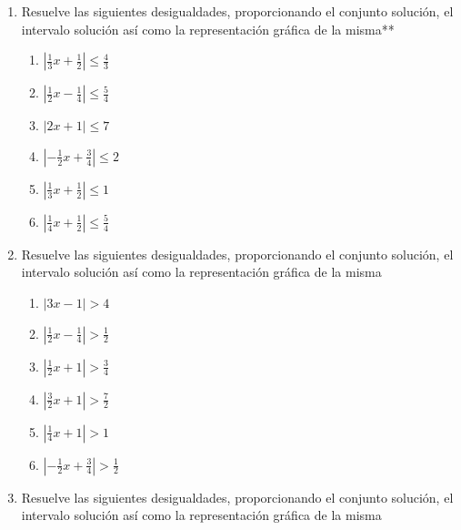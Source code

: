 \documentclass[12pt]{article}
\begin{document}
{\begin{enumerate}
  \begin{enumerate}
  \def\labelenumii{\arabic{enumii}.}
  \setcounter{enumii}{2}
  \item
    \(|3x-1|<7\)
  \item
    \(|x-2|<4\)
  \item
    \(|\frac{3}{2}x+1|<5\)
  \item
    \(|2x+1|<6\)
  \item
    \(|\frac{1}{4}x+1|<\frac{7}{2}\)
  \item
    \(|\frac{1}{3}x+\frac{1}{2}|<\frac{5}{6}\)
  \end{enumerate}
\item
  Resuelve las siguientes desigualdades, proporcionando el conjunto  solución, el intervalo solución así como la representación gráfica de  la misma**

  \begin{enumerate}
  \def\labelenumii{\arabic{enumii}.}
  \setcounter{enumii}{3}
  \item
    \(|\frac{1}{3}x+\frac{1}{2}|\leq \frac{4}{3}\)
  \item
    \(|\frac{1}{2}x-\frac{1}{4}|\leq \frac{5}{4}\)
  \item
    \(|2x+1|\leq 7\)
  \item
    \(|-\frac{1}{2}x+\frac{3}{4}|\leq 2\)
  \item
    \(|\frac{1}{3}x+\frac{1}{2}|\leq 1\)
  \item
    \(|\frac{1}{4}x+\frac{1}{2}|\leq \frac{5}{4}\)
  \end{enumerate}
\item
  Resuelve las siguientes desigualdades, proporcionando el conjunto  solución, el intervalo solución así como la representación gráfica de  la misma

  \begin{enumerate}
  \def\labelenumii{\arabic{enumii}.}
  \item
    \(|3x-1|>4\)
  \item
    \(|\frac{1}{2}x-\frac{1}{4}|>\frac{1}{2}\)
  \item
    \(|\frac{1}{2}x+1|>\frac{3}{4}\)
  \item
    \(|\frac{3}{2}x+1|>\frac{7}{2}\)
  \item
    \(|\frac{1}{4}x+1|>1\)
  \item
    \(|-\frac{1}{2}x+\frac{3}{4}|>\frac{1}{2}\)
  \end{enumerate}
\item
  Resuelve las siguientes desigualdades, proporcionando el conjunto  solución, el intervalo solución así como la representación gráfica de   la misma


\end{enumerate}}
\end{document}
